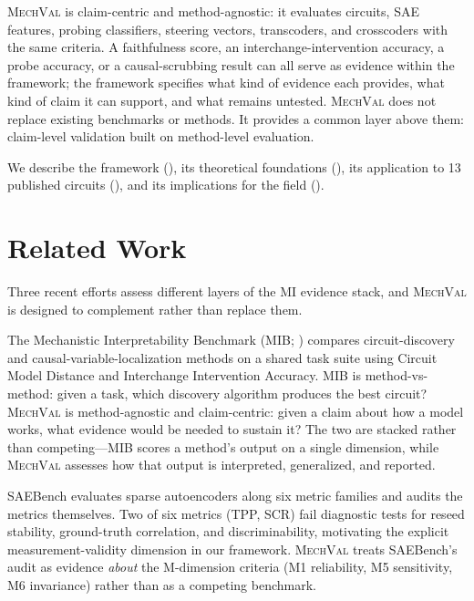\documentclass[10pt]{article}
\newcommand{\mechval}{\textsc{MechVal}}
\begin{document}
\mechval{} is claim-centric and method-agnostic: it evaluates circuits, SAE features,
probing classifiers, steering vectors, transcoders, and crosscoders with the same
criteria. A faithfulness score, an interchange-intervention accuracy, a probe accuracy, or
a causal-scrubbing result can all serve as evidence within the framework; the framework
specifies what kind of evidence each provides, what kind of claim it can support, and what
remains untested. \mechval{} does not replace existing benchmarks or methods. It provides a
common layer above them: claim-level validation built on method-level evaluation.

We describe the framework (), its theoretical foundations
(), its application to 13 published circuits
(), and its implications for the field ().

\section{Related Work}
\label{sec:related}

Three recent efforts assess different layers of the MI evidence stack, and \mechval{} is designed to complement rather than replace them.

The Mechanistic Interpretability Benchmark (MIB; \citealp{mueller2025mib}) compares circuit-discovery and causal-variable-localization methods on a shared task suite using Circuit Model Distance and Interchange Intervention Accuracy. MIB is method-vs-method: given a task, which discovery algorithm produces the best circuit? \mechval{} is method-agnostic and claim-centric: given a claim about how a model works, what evidence would be needed to sustain it? The two are stacked rather than competing---MIB scores a method's output on a single dimension, while \mechval{} assesses how that output is interpreted, generalized, and reported.

SAEBench \citep{karvonen2025saebench} evaluates sparse autoencoders along six metric families and audits the metrics themselves. Two of six metrics (TPP, SCR) fail diagnostic tests for reseed stability, ground-truth correlation, and discriminability, motivating the explicit measurement-validity dimension in our framework. \mechval{} treats SAEBench's audit as evidence \emph{about} the M-dimension criteria (M1 reliability, M5 sensitivity, M6 invariance) rather than as a competing benchmark.
\end{document}
